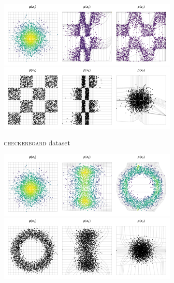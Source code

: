 \begin{figure}[!htb]\ContinuedFloat
  \begin{center}
    \begin{subfigure}{0.48\linewidth}
      \centering
      \includegraphics[width=\linewidth,trim=0cm 0cm 0cm 1.6cm, clip]{figures/2D/CHECKERBOARD/plot_generative_flow_evolution.png}
      \includegraphics[width=\linewidth,trim=0cm 0cm 0cm 1.6cm, clip]{figures/2D/CHECKERBOARD/plot_normalizing_flow_evolution.png}
      \caption{\textsc{checkerboard} dataset}
      \label{fig:NF_2D_CHECKERBOARD}
    \end{subfigure}
    \hfill{\color{lightgray}\vrule}\hfill
    \begin{subfigure}{0.48\linewidth}
      \centering
      \includegraphics[width=\linewidth,trim=0cm 0cm 0cm 1.6cm, clip]{figures/2D/CIRCLES/plot_generative_flow_evolution.png}
      \includegraphics[width=\linewidth,trim=0cm 0cm 0cm 1.6cm, clip]{figures/2D/CIRCLES/plot_normalizing_flow_evolution.png}

\end{subfigure}
\end{center}
\end{figure}
